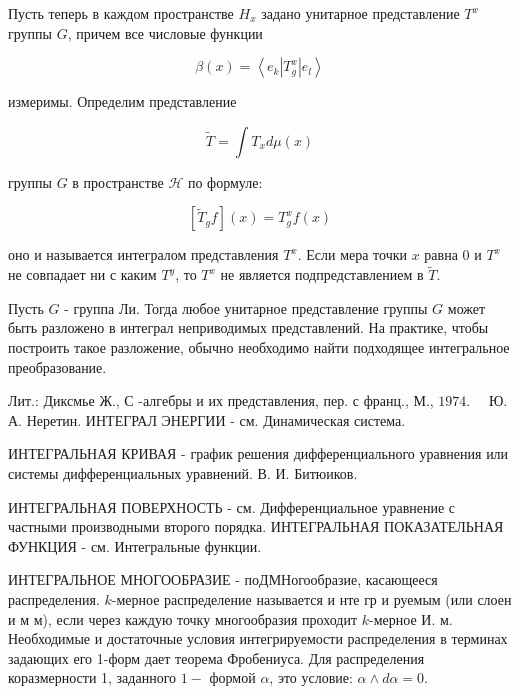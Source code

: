 \documentclass[10pt]{article}
\begin{document}
Пусть теперь в каждом пространстве $H_{x}$ задано унитарное представление $T^{x}$ группы $G$, причем все числовые функции



\[

\beta(x)=\left\langle e_{k}\left|T_{g}^{x}\right| e_{l}\right\rangle

\]



измеримы. Определим представление



\[

\tilde{T}=\int T_{x} d \mu(x)

\]



группы $G$ в пространстве $\mathscr{H}$ по формуле:



\[

\left[\widetilde{T}_{g} f\right](x)=T_{g}^{x} f(x)

\]



оно и называется интегралом представления $T^{x}$. Если мера точки $x$ равна 0 и $T^{x}$ не совпадает ни с каким $T^{y}$, то $T^{x}$ не является подпредставлением в $\widetilde{T}$.



Пусть $G$ - группа Ли. Тогда любое унитарное представление группы $G$ может быть разложено в интеграл неприводимых представлений. На практике, чтобы построить такое разложение, обычно необходимо найти подходящее интегральное преобразование.



Лит.: Диксмье Ж., С -алгебры и их представления, пер. с франц., М., $1974 . \quad$ Ю. А. Неретин. ИНТЕГРАЛ ЭНЕРГИИ - см. Динамическая система.



ИНТЕГРАЛЬНАЯ КРИВАЯ - график решения дифференциального уравнения или системы дифференциальных уравнений. В. И. Битюиков.



ИНТЕГРАЛЬНАЯ ПОВЕРХНОСТЬ - см. Дифференциальное уравнение с частными производными второго порядка. ИНТЕГРАЛЬНАЯ ПОКАЗАТЕЛЬНАЯ ФУНКЦИЯ - см. Интегральные функции.



ИНТЕГРАЛЬНОЕ МНОГООБРАЗИЕ - поДМНогообразие, касающееся распределения. $k$-мерное распределение называется и нте гр и руемым (или слоен и м м), если через каждую точку многообразия проходит $k$-мерное И. м. Необходимые и достаточные условия интегрируемости распределения в терминах задающих его 1-форм дает теорема Фробениуса. Для распределения коразмерности 1, заданного $1-$ формой $\alpha$, это условие: $\alpha \wedge d \alpha=0$.
\end{document}
